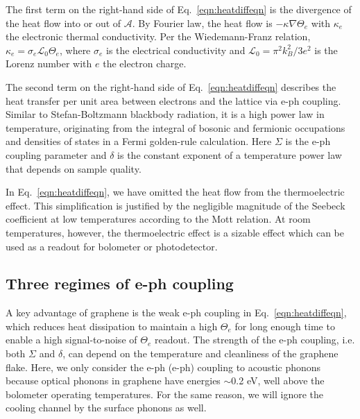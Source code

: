 \documentclass[aip, amsmath,amssymb, reprint]{revtex4-1}
\begin{document}
The first term on the right-hand side of Eq.\ \ref{eqn:heatdiffeqn} is the divergence of the heat flow into or out of $\mathcal{A}$. By Fourier law, the heat flow is $-\kappa\nabla\Theta_e$ with $\kappa_e$ the electronic thermal conductivity. Per the Wiedemann-Franz relation, $\kappa_e = \sigma_e\mathcal{L}_0\Theta_e$, where $\sigma_e$ is the electrical conductivity and $\mathcal{L}_0 = \pi^2k_B^2/3e^2$ is the Lorenz number with $e$ the electron charge.

The second term on the right-hand side of Eq.\ \ref{eqn:heatdiffeqn} describes the heat transfer per unit area between electrons and the lattice via e-ph coupling\cite{Viljas.2010,Chen.2012,Massicotte.2021}. Similar to Stefan-Boltzmann blackbody radiation, it is a high power law in temperature, originating from the integral of bosonic and fermionic occupations and densities of states in a Fermi golden-rule calculation. Here $\Sigma$ is the e-ph coupling parameter and $\delta$ is the constant exponent of a temperature power law that depends on sample quality.

In Eq.\ \ref{eqn:heatdiffeqn}, we have omitted the heat flow from the thermoelectric effect\cite{Massicotte.2021}. This simplification is justified by the negligible magnitude of the Seebeck coefficient at low temperatures according to the Mott relation\cite{Vera-Marun.2016}. At room temperatures, however, the thermoelectric effect is a sizable effect which can be used as a readout for bolometer or photodetector\cite{Gabor.2011,Cai.2014,Skoblin.2018}.

\subsection{Three regimes of e-ph coupling}

A key advantage of graphene is the weak e-ph coupling in Eq.\ \ref{eqn:heatdiffeqn}, which reduces heat dissipation to maintain a high $\Theta_e$ for long enough time to enable a high signal-to-noise of $\Theta_e$ readout. The strength of the e-ph coupling, i.e. both $\Sigma$ and $\delta$, can depend on the temperature and cleanliness of the graphene flake. Here, we only consider the e-ph (e-ph) coupling to acoustic phonons because optical phonons in graphene have energies $\sim$0.2 eV, well above the bolometer operating temperatures\cite{Sarma.2011,Song.201102t}. For the same reason, we will ignore the cooling channel by the surface phonons\cite{Rengel.2014,Crossno.2015,Massicotte.2021} as well.
\end{document}
